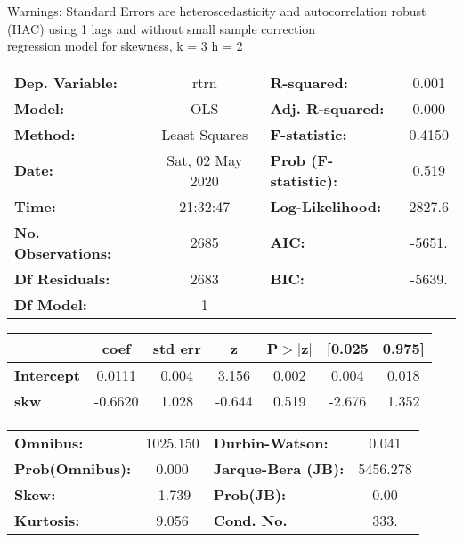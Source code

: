 Warnings: \newline
 [1] Standard Errors are heteroscedasticity and autocorrelation robust (HAC) using 1 lags and without small sample correction\\ 

regression model for skewness, k = 3 h = 2\begin{center}
\begin{tabular}{lclc}
\toprule
\textbf{Dep. Variable:}    &       rtrn       & \textbf{  R-squared:         } &     0.001   \\
\textbf{Model:}            &       OLS        & \textbf{  Adj. R-squared:    } &     0.000   \\
\textbf{Method:}           &  Least Squares   & \textbf{  F-statistic:       } &    0.4150   \\
\textbf{Date:}             & Sat, 02 May 2020 & \textbf{  Prob (F-statistic):} &    0.519    \\
\textbf{Time:}             &     21:32:47     & \textbf{  Log-Likelihood:    } &    2827.6   \\
\textbf{No. Observations:} &        2685      & \textbf{  AIC:               } &    -5651.   \\
\textbf{Df Residuals:}     &        2683      & \textbf{  BIC:               } &    -5639.   \\
\textbf{Df Model:}         &           1      & \textbf{                     } &             \\
\bottomrule
\end{tabular}
\begin{tabular}{lcccccc}
                   & \textbf{coef} & \textbf{std err} & \textbf{z} & \textbf{P$> |$z$|$} & \textbf{[0.025} & \textbf{0.975]}  \\
\midrule
\textbf{Intercept} &       0.0111  &        0.004     &     3.156  &         0.002        &        0.004    &        0.018     \\
\textbf{skw}       &      -0.6620  &        1.028     &    -0.644  &         0.519        &       -2.676    &        1.352     \\
\bottomrule
\end{tabular}
\begin{tabular}{lclc}
\textbf{Omnibus:}       & 1025.150 & \textbf{  Durbin-Watson:     } &    0.041  \\
\textbf{Prob(Omnibus):} &   0.000  & \textbf{  Jarque-Bera (JB):  } & 5456.278  \\
\textbf{Skew:}          &  -1.739  & \textbf{  Prob(JB):          } &     0.00  \\
\textbf{Kurtosis:}      &   9.056  & \textbf{  Cond. No.          } &     333.  \\
\bottomrule
\end{tabular}
\end{center}

